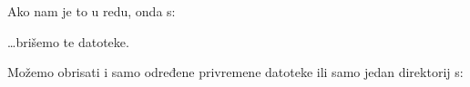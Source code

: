 

Ako nam je to u redu, onda s:


\dots{}brišemo te datoteke.

Možemo obrisati i samo određene privremene datoteke ili samo jedan direktorij s:




